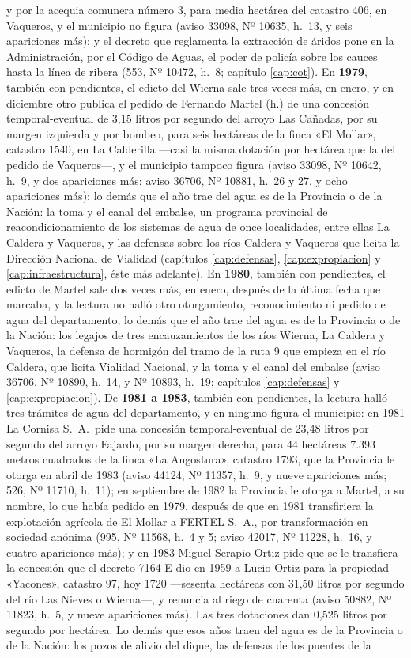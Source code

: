{y por la acequia comunera número 3, para media hectárea del catastro 406, en Vaqueros, y el municipio no figura (aviso 33098, Nº 10635, h.\ 13, y seis apariciones más); y el decreto que reglamenta la extracción de áridos pone en la Administración, por el Código de Aguas, el poder de policía sobre los cauces hasta la línea de ribera (553, Nº 10472, h.\ 8; capítulo \ref{cap:cot}). En \textbf{1979}, también con pendientes, el edicto del Wierna sale tres veces más, en enero, y en diciembre otro publica el pedido de Fernando Martel (h.) de una concesión temporal-eventual de 3,15 litros por segundo del arroyo Las Cañadas, por su margen izquierda y por bombeo, para seis hectáreas de la finca «El Mollar», catastro 1540, en La Calderilla ---casi la misma dotación por hectárea que la del pedido de Vaqueros---, y el municipio tampoco figura (aviso 33098, Nº 10642, h.\ 9, y dos apariciones más; aviso 36706, Nº 10881, h.\ 26 y 27, y ocho apariciones más); lo demás que el año trae del agua es de la Provincia o de la Nación: la toma y el canal del embalse, un programa provincial de reacondicionamiento de los sistemas de agua de once localidades, entre ellas La Caldera y Vaqueros, y las defensas sobre los ríos Caldera y Vaqueros que licita la Dirección Nacional de Vialidad (capítulos \ref{cap:defensas}, \ref{cap:expropiacion} y \ref{cap:infraestructura}, éste más adelante). En \textbf{1980}, también con pendientes, el edicto de Martel sale dos veces más, en enero, después de la última fecha que marcaba, y la lectura no halló otro otorgamiento, reconocimiento ni pedido de agua del departamento; lo demás que el año trae del agua es de la Provincia o de la Nación: los legajos de tres encauzamientos de los ríos Wierna, La Caldera y Vaqueros, la defensa de hormigón del tramo de la ruta 9 que empieza en el río Caldera, que licita Vialidad Nacional, y la toma y el canal del embalse (aviso 36706, Nº 10890, h.\ 14, y Nº 10893, h.\ 19; capítulos \ref{cap:defensas} y \ref{cap:expropiacion}). De \textbf{1981 a 1983}, también con pendientes, la lectura halló tres trámites de agua del departamento, y en ninguno figura el municipio: en 1981 La Cornisa S.\ A.\ pide una concesión temporal-eventual de 23,48 litros por segundo del arroyo Fajardo, por su margen derecha, para 44 hectáreas 7.393 metros cuadrados de la finca «La Angostura», catastro 1793, que la Provincia le otorga en abril de 1983 (aviso 44124, Nº 11357, h.\ 9, y nueve apariciones más; 526, Nº 11710, h.\ 11); en septiembre de 1982 la Provincia le otorga a Martel, a su nombre, lo que había pedido en 1979, después de que en 1981 transfiriera la explotación agrícola de El Mollar a FERTEL S.\ A., por transformación en sociedad anónima (995, Nº 11568, h.\ 4 y 5; aviso 42017, Nº 11228, h.\ 16, y cuatro apariciones más); y en 1983 Miguel Serapio Ortiz pide que se le transfiera la concesión que el decreto 7164-E dio en 1959 a Lucio Ortiz para la propiedad «Yacones», catastro 97, hoy 1720 ---sesenta hectáreas con 31,50 litros por segundo del río Las Nieves o Wierna---, y renuncia al riego de cuarenta (aviso 50882, Nº 11823, h.\ 5, y nueve apariciones más). Las tres dotaciones dan 0,525 litros por segundo por hectárea. Lo demás que esos años traen del agua es de la Provincia o de la Nación: los pozos de alivio del dique, las defensas de los puentes de la }
